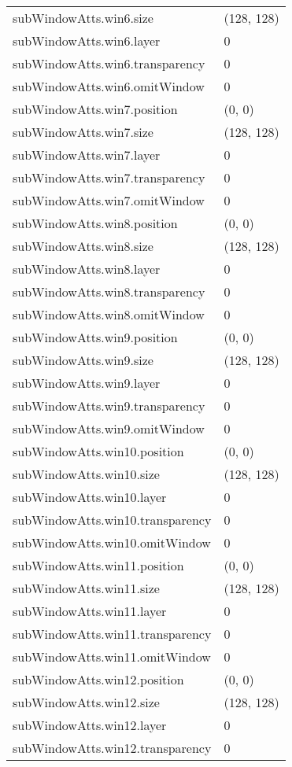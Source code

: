 \documentclass[10pt,a4paper]{report}
\begin{document}
\begin{longtable}{ll}
subWindowAtts.win6.size  &  (128, 128) \\
subWindowAtts.win6.layer  &  0 \\
subWindowAtts.win6.transparency  &  0 \\
subWindowAtts.win6.omitWindow  &  0 \\
subWindowAtts.win7.position  &  (0, 0) \\
subWindowAtts.win7.size  &  (128, 128) \\
subWindowAtts.win7.layer  &  0 \\
subWindowAtts.win7.transparency  &  0 \\
subWindowAtts.win7.omitWindow  &  0 \\
subWindowAtts.win8.position  &  (0, 0) \\
subWindowAtts.win8.size  &  (128, 128) \\
subWindowAtts.win8.layer  &  0 \\
subWindowAtts.win8.transparency  &  0 \\
subWindowAtts.win8.omitWindow  &  0 \\
subWindowAtts.win9.position  &  (0, 0) \\
subWindowAtts.win9.size  &  (128, 128) \\
subWindowAtts.win9.layer  &  0 \\
subWindowAtts.win9.transparency  &  0 \\
subWindowAtts.win9.omitWindow  &  0 \\
subWindowAtts.win10.position  &  (0, 0) \\
subWindowAtts.win10.size  &  (128, 128) \\
subWindowAtts.win10.layer  &  0 \\
subWindowAtts.win10.transparency  &  0 \\
subWindowAtts.win10.omitWindow  &  0 \\
subWindowAtts.win11.position  &  (0, 0) \\
subWindowAtts.win11.size  &  (128, 128) \\
subWindowAtts.win11.layer  &  0 \\
subWindowAtts.win11.transparency  &  0 \\
subWindowAtts.win11.omitWindow  &  0 \\
subWindowAtts.win12.position  &  (0, 0) \\
subWindowAtts.win12.size  &  (128, 128) \\
subWindowAtts.win12.layer  &  0 \\
subWindowAtts.win12.transparency  &  0 \\

\end{longtable}
\end{document}
